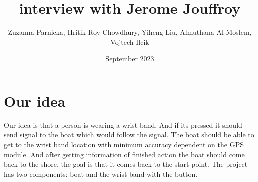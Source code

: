 \documentclass{article}[10pt]
\title{interview with Jerome Jouffroy}
\author{Zuzanna Parnicka, Hritik Roy Chowdhury, Yiheng Liu, Almuthana Al Moslem, Vojtech Ilcik}
\date{September 2023}
\begin{document}
\renewcommand{\labelenumii}{\arabic{enumi}.\arabic{enumii}}
\renewcommand{\labelenumiii}{\arabic{enumi}.\arabic{enumii}.\arabic{enumiii}}
\renewcommand{\labelenumiv}{\arabic{enumi}.\arabic{enumii}.\arabic{enumiii}.\arabic{enumiv}}

\maketitle
\section{Our idea}
Our idea is that a person is wearing a wrist band. And if its pressed it should send signal to the boat which would follow the signal. 
The boat should be able to get to the wrist band location with minimum accuracy dependent on the GPS module. And after getting information of finished action the boat should 
come back to the shore, the goal is that it comes back to the start point. 
The project has two components: boat and the wrist band with the button. 
\end{document}

